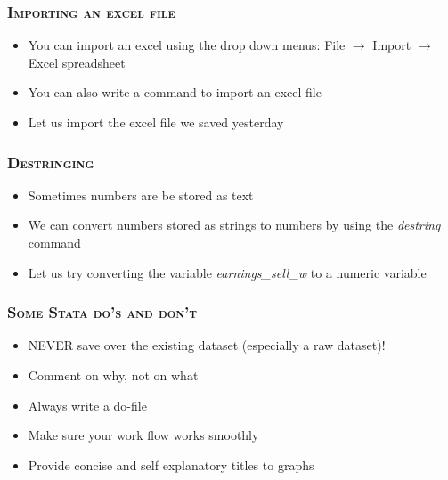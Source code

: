 \documentclass[10pt]{beamer}
\begin{document}
	
	\begin{frame}
		\frametitle{\textsc{Importing an excel file}}
		\begin{itemize}
		\item You can import an excel using the drop down menus:
		File $\rightarrow$ Import $\rightarrow$ Excel spreadsheet
		\item You can also write a command to import an excel file
		\item Let us import the excel file we saved yesterday
		\end{itemize}
		
\begin{stlog}\end{stlog}
		
		
		
	\end{frame}
	
	\begin{frame}
		\frametitle{\textsc{Destringing}}

		\begin{itemize}
			\item Sometimes numbers are be stored as text
			\item We can convert numbers stored as strings to numbers by using the \textit{destring} command
			\item Let us try converting the variable \textit{earnings\_sell\_w} to a numeric variable
		\end{itemize}
\begin{stlog}\end{stlog}
	\end{frame}
		\begin{frame}
	\frametitle{\textsc{Some Stata do's and don't}}
	\begin{itemize}
		  \item NEVER save over the existing dataset (especially a raw dataset)!
		  \item Comment on why, not on what
		
		\item Always write a do-file
		  \item Make sure your work flow works smoothly
		  \item Provide concise and self explanatory titles to graphs
	  \end{itemize}
	 \end{frame}	
	 
	 
	 
\end{document}
